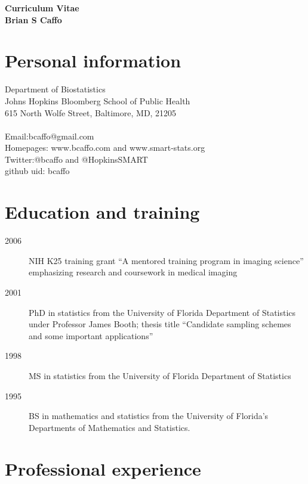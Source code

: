 \documentclass[12pt]{article}
\begin{document}
{ \vspace{-.5in}
\begin{center}
\large
\bf Curriculum Vitae\\
 Brian S Caffo 
\end{center}
}

\section*{Personal information}
Department of Biostatistics\\
Johns Hopkins Bloomberg School of Public Health \\ 
615 North Wolfe Street, Baltimore, MD, 21205 \\ \\
Email:bcaffo@gmail.com \\
Homepages: www.bcaffo.com and www.smart-stats.org \\
Twitter:@bcaffo and @HopkinsSMART \\
github uid: bcaffo

\section*{Education and training}
\begin{description}
\item[\textnormal{2006}] NIH K25 training grant ``A mentored training program in imaging science'' emphasizing research and coursework in medical imaging
\item[\textnormal{2001}] PhD in statistics from the University of Florida Department of Statistics under Professor James Booth; thesis title ``Candidate sampling schemes and some important applications''
\item[\textnormal{1998}] MS in statistics from the University of Florida Department of Statistics
\item[\textnormal{1995}] BS in mathematics and statistics from the University of Florida's Departments of Mathematics and Statistics.
\end{description}


\section*{Professional experience}
\end{document}
